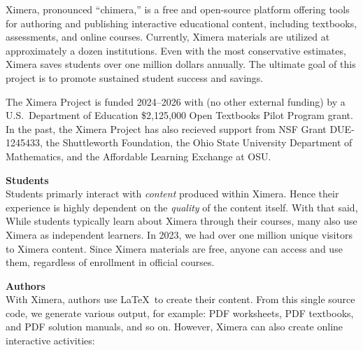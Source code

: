 \documentclass{article}
\begin{document}
\pagestyle{title}
\begin{multicols}{2}
    Ximera, pronounced ``chimera,'' is a free and
    open-source platform offering tools for authoring and publishing
    interactive educational content, including textbooks, assessments, and
    online
    courses. Currently, Ximera materials are utilized at approximately a dozen
    institutions. Even with the most conservative estimates, Ximera saves
    students
    over one million dollars annually. The ultimate goal of this project is to
    promote sustained student success and savings.

    The Ximera Project is funded 2024--2026 with (no other external funding) by
    a U.S.\ Department of Education \$2,125,000
    Open Textbooks Pilot Program grant. In the past, the Ximera Project has
    also recieved support from NSF Grant
    DUE-1245433, the Shuttleworth Foundation, the Ohio State University
    Department of Mathematics, and the Affordable Learning Exchange at OSU.

    \begin{xframe}
        {\sffamily\bfseries Students}\\
        Students primarly interact with \textit{content} produced within
        Ximera. Hence their experience is highly dependent on the
        \textit{quality} of
        the content itself. With that said,
        While students typically learn about Ximera through their courses, many
        also use Ximera as independent learners. In 2023, we had over one
        million unique visitors to Ximera content. Since Ximera materials are
        free,
        anyone can access and use them, regardless of enrollment in official
        courses.
    \end{xframe}

    \begin{xframe}
        {\sffamily\bfseries Authors}\\
        With Ximera, authors use \LaTeX\ to create their content. From this
        single
        source code, we generate various output, for example: PDF worksheets,
        PDF
        textbooks, and	PDF solution manuals, and so on. However, Ximera can
        also create
        online interactive activities:
        \begin{center}
\end{center}
\end{xframe}
\end{multicols}
\end{document}
